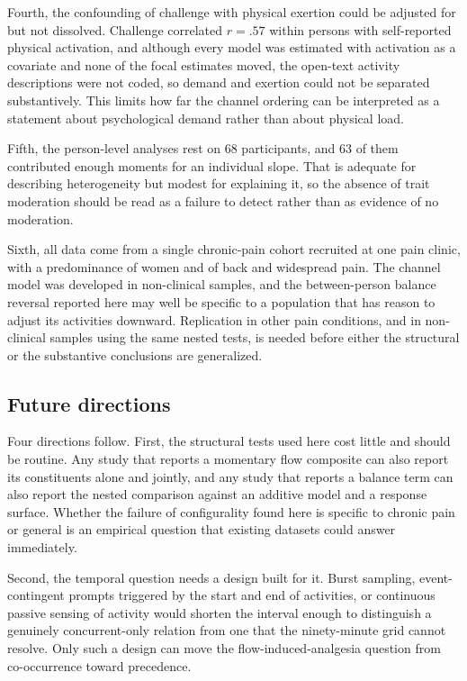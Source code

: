 \documentclass[11pt,a4paper]{article}
\begin{document}
Fourth, the confounding of challenge with physical exertion could be adjusted for but not
dissolved. Challenge correlated $r=.57$ within persons with self-reported physical activation, and
although every model was estimated with activation as a covariate and none of the focal estimates
moved, the open-text activity descriptions were not coded, so demand and exertion could not be
separated substantively. This limits how far the channel ordering can be interpreted as a statement
about psychological demand rather than about physical load.

Fifth, the person-level analyses rest on 68 participants, and 63 of them contributed enough moments
for an individual slope. That is adequate for describing heterogeneity but modest for explaining
it, so the absence of trait moderation should be read as a failure to detect rather than as
evidence of no moderation.

Sixth, all data come from a single chronic-pain cohort recruited at one pain clinic, with a
predominance of women and of back and widespread pain. The channel model was developed in
non-clinical samples, and the between-person balance reversal reported here may well be specific to
a population that has reason to adjust its activities downward. Replication in other pain
conditions, and in non-clinical samples using the same nested tests, is needed before either the
structural or the substantive conclusions are generalized.

\subsection{Future directions}
Four directions follow. First, the structural tests used here cost little and should be routine.
Any study that reports a momentary flow composite can also report its constituents alone and
jointly, and any study that reports a balance term can also report the nested comparison against
an additive model and a response surface. Whether the failure of configurality found here is
specific to chronic pain or general is an empirical question that existing datasets could answer
immediately.

Second, the temporal question needs a design built for it. Burst sampling, event-contingent prompts
triggered by the start and end of activities, or continuous passive sensing of activity would
shorten the interval enough to distinguish a genuinely concurrent-only relation from one that the
ninety-minute grid cannot resolve. Only such a design can move the flow-induced-analgesia question
from co-occurrence toward precedence.
\end{document}
